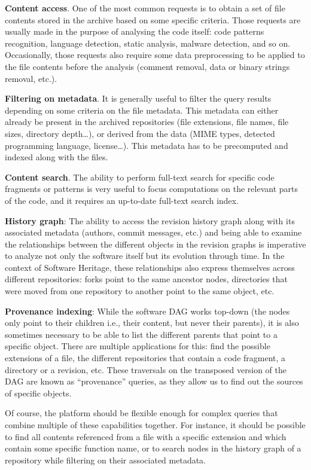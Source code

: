 \textbf{Content access}. One of the most common requests is to obtain a set of
file contents stored in the archive based on some specific criteria. Those
requests are usually made in the purpose of analysing the code itself: code
patterns recognition, language detection, static analysis, malware detection,
and so on.  Occasionally, those requests also require some data preprocessing
to be applied to the file contents before the analysis (comment removal, data
or binary strings removal, etc.).

\textbf{Filtering on metadata}. It is generally useful to filter the query
results depending on some criteria on the file metadata. This metadata
can either already be present in the archived repositories (file extensions,
file names, file sizes, directory depth…), or derived from the data (MIME
types, detected programming language, license…). This metadata has to be
precomputed and indexed along with the files.

\textbf{Content search}. The ability to perform full-text search for
specific code fragments or patterns is very useful to focus
computations on the relevant parts of the code, and it requires an up-to-date
full-text search index.

\textbf{History graph}: The ability to access the revision history graph along
with its associated metadata (authors, commit messages, etc.) and being able to
examine the relationships between the different objects in the revision graphs
is imperative to analyze not only the software itself but its evolution through
time. In the context of Software Heritage, these relationships also express
themselves across different repositories: forks point to the same ancestor
nodes, directories that were moved from one repository to another point to the
same object, etc.

\textbf{Provenance indexing}: While the software DAG works top-down (the nodes
only point to their children i.e., their content, but never their parents), it
is also sometimes necessary to be able to list the different parents that point
to a specific object. There are multiple applications for this: find the
possible extensions of a file, the different repositories that contain a code
fragment, a directory or a revision, etc. These traversals on the transposed
version of the DAG are known as ``provenance'' queries, as they allow us to
find out the sources of specific objects.

Of course, the platform should be flexible enough for complex queries that
combine multiple of these capabilities together. For instance, it should be
possible to find all contents referenced from a file with a specific extension
and which contain some specific function name, or to search nodes in the
history graph of a repository while filtering on their associated metadata.

